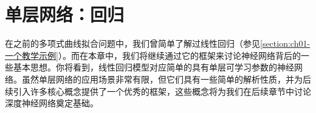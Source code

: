 \documentclass[../main.tex]{subfiles}
\begin{document}
\chapter{单层网络：回归}\label{chapter:ch04-回归}

在之前的多项式曲线拟合问题中，我们曾简单了解过线性回归（参见\cref{section:ch01-一个教学示例}）。而在本章中，我们将继续通过它的框架来讨论神经网络背后的一些基本思想。你将看到，线性回归模型对应简单的具有单层可学习参数的神经网络。虽然单层网络的应用场景非常有限，但它们具有一些简单的解析性质，并为后续引入许多核心概念提供了一个优秀的框架，这些概念将为我们在后续章节中讨论深度神经网络奠定基础。





\end{document}
